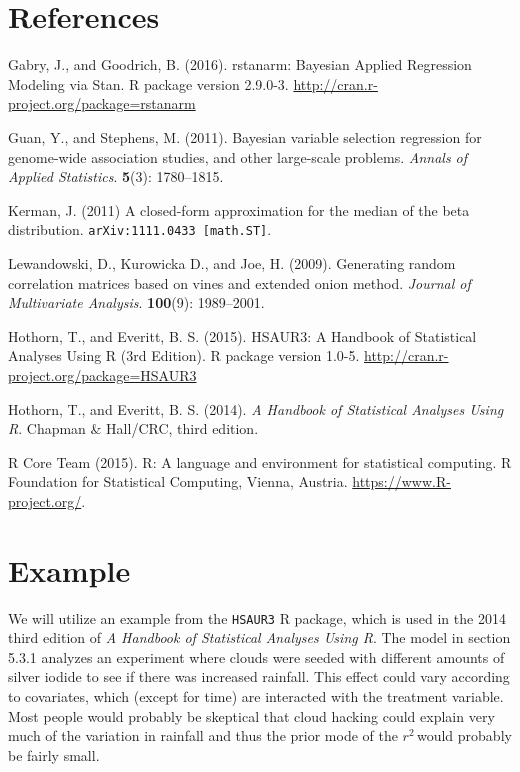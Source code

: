 \documentclass[11pt]{article}
\newcommand{\Rsq}{$r^2\,$}
\begin{document}
\section*{References}

\noindent

\bibitem Gabry, J., and Goodrich, B. (2016). rstanarm: Bayesian Applied
Regression Modeling via Stan. R package version 2.9.0-3.
\url{http://cran.r-project.org/package=rstanarm}

\bibitem Guan, Y., and Stephens, M. (2011). Bayesian variable selection
regression for genome-wide association studies, and other large-scale problems.
\emph{Annals of Applied Statistics}. {\bf 5}(3): 1780--1815.

\bibitem Kerman, J. (2011) A closed-form approximation for the median of the
beta distribution. {\tt arXiv:1111.0433 [math.ST]}.

\bibitem Lewandowski, D., Kurowicka D., and Joe, H. (2009). Generating random
correlation matrices based on vines and extended onion method.
\emph{Journal of Multivariate Analysis}. {\bf 100}(9): 1989--2001.

\bibitem Hothorn, T., and Everitt, B. S. (2015).  HSAUR3: A Handbook of
Statistical Analyses Using R (3rd Edition). R package version 1.0-5.
\url{http://cran.r-project.org/package=HSAUR3}

\bibitem Hothorn, T., and Everitt, B. S. (2014). \emph{A Handbook of
Statistical Analyses Using R}. Chapman \& Hall/CRC, third edition.

\bibitem R Core Team (2015). R: A language and environment for statistical
computing. R Foundation for Statistical Computing, Vienna, Austria.
\url{https://www.R-project.org/}.


\appendix
\clearpage
\section{Example}


We will utilize an example from the {\tt HSAUR3} R package, which is used in the
2014 third edition of \emph{A Handbook of Statistical Analyses Using R}.
The model in section 5.3.1 analyzes an experiment where clouds were seeded
with different amounts of silver iodide to see if there was increased rainfall.
This effect could vary according to covariates, which (except for time) are
interacted with the treatment variable. Most people would probably be skeptical
that cloud hacking could explain very much of the variation in rainfall and
thus the prior mode of the \Rsq would probably be fairly small.
\end{document}
